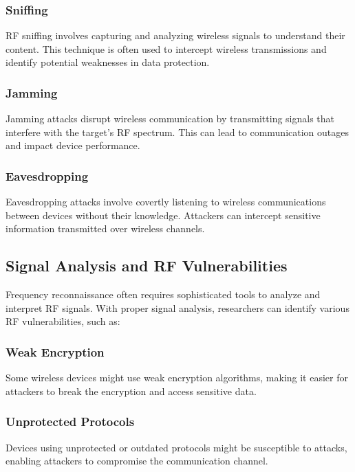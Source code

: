 \documentclass{article}
\begin{document}
\subsubsection{Sniffing}

RF sniffing involves capturing and analyzing wireless signals to understand their content. This technique is often used to intercept wireless transmissions and identify potential weaknesses in data protection.

\subsubsection{Jamming}

Jamming attacks disrupt wireless communication by transmitting signals that interfere with the target's RF spectrum. This can lead to communication outages and impact device performance.

\subsubsection{Eavesdropping}

Eavesdropping attacks involve covertly listening to wireless communications between devices without their knowledge. Attackers can intercept sensitive information transmitted over wireless channels.

\subsection{Signal Analysis and RF Vulnerabilities}

Frequency reconnaissance often requires sophisticated tools to analyze and interpret RF signals. With proper signal analysis, researchers can identify various RF vulnerabilities, such as:

\subsubsection{Weak Encryption}

Some wireless devices might use weak encryption algorithms, making it easier for attackers to break the encryption and access sensitive data.

\subsubsection{Unprotected Protocols}

Devices using unprotected or outdated protocols might be susceptible to attacks, enabling attackers to compromise the communication channel.
\end{document}
